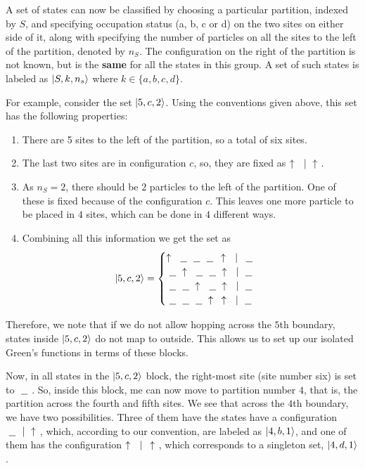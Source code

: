	A set of states can now be classified by choosing a particular partition, indexed by $ S $, and specifying occupation status (a, b, c or d) on the two sites on either side of it, along with specifying the number of particles on all the sites to the left of the partition, denoted by $ n_S $. The configuration on the right of the partition is not known, but is the \textbf{same} for all the states in this group. A set of such states is labeled as $ \ket{S, k, n_s} $ where $ k \in \{a, b, c, d\} $.
	
	For example, consider the set $ \ket{5,c,2} $. Using the conventions given above, this set has the following properties:
	\begin{enumerate}
		\item There are 5 sites to the left of the partition, so a total of six sites.
		\item The last two sites are in configuration $ c $, so, they are fixed as $ \uparrow\  \ |\  \uparrow\  $.
		\item As $ n_S = 2 $, there should be $ 2 $ particles to the left of the partition. One of these is fixed because of the configuration $ c $. This leaves one more particle to be placed in $ 4 $ sites, which can be done in $ 4 $ different ways.
		\item Combining all this information we get the set as
		\begin{align*}
			\ket{5,c,2} =
			\begin{cases}
				\uparrow\  \ \underline{\ \ }\  \ \underline{\ \ }\  \ \underline{\ \ }\  \,\uparrow\  \ |\ \, \ \underline{\ \ }\  \\
				\ \underline{\ \ }\  \uparrow\  \ \underline{\ \ }\  \ \underline{\ \ }\  \uparrow\  \ |\  \ \underline{\ \ }\  \\
				\ \underline{\ \ }\  \ \underline{\ \ }\  \uparrow\  \ \underline{\ \ }\  \uparrow\  \ |\  \ \underline{\ \ }\  \\
				\ \underline{\ \ }\  \ \underline{\ \ }\  \ \underline{\ \ }\  \uparrow\ \,\,\,\uparrow\  \ |\  \ \underline{\ \ }\  \\
			\end{cases}
		\end{align*}
	\end{enumerate}
	Therefore, we note that if we do not allow hopping across the $ 5 $th boundary, states inside $ \ket{5, c, 2} $ do not map to outside. This allows us to set up our isolated Green's functions in terms of these blocks.
	
	Now, in all states in the $ \ket{5, c, 2} $ block, the right-most site (site number six) is set to $ \ \underline{\ \ }\  $. So, inside this block, me can now move to partition number $ 4 $, that is, the partition across the fourth and fifth sites. We see that across the $ 4 $th boundary, we have two possibilities. Three of them have the states have a configuration $ \ \underline{\ \ }\  \ |\  \uparrow\  $, which, according to our convention, are labeled as $ \ket{4, b, 1} $, and one of them has the configuration $ \uparrow\  \ |\ \, \uparrow\  $, which corresponds to a singleton set, $ \ket{4, d, 1} $.
	
